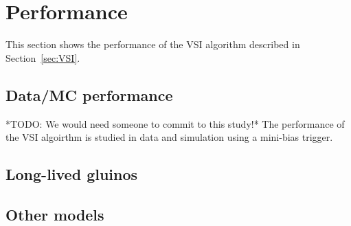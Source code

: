 
%
\section{Performance \label{sec:Performance} }

This section shows the performance of the VSI algorithm described in Section~\ref{sec:VSI}.

%
\subsection{Data/MC performance \label{sec:Performance:DataMC} }
%

*TODO: We would need someone to commit to this study!*
The performance of the VSI algoirthm is studied in data and simulation using a mini-bias trigger.

%
\subsection{Long-lived gluinos}
%

%
\subsection{Other models}
%
